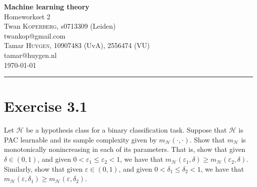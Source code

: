 \documentclass[10pt, a4paper, twoside]{amsart}
\makeatletter
\newcommand{\firstName}  {Twan}
\newcommand{\lastName}   {Koperberg}
\newcommand{\studId}     {0713309 (Leiden)}
\renewcommand{\email}    {twankop@gmail.com}
\newcommand{\firstNameII}  {Tamar}
\newcommand{\lastNameII}   {Huygen}
\newcommand{\studIdII}     {10907483 (UvA)}
\newcommand{\studIdIII}    {2556474 (VU)}
\newcommand{\emailII}     {tamar@huygen.nl}
\makeatother
\begin{document}
\begin{center}

  {\huge\bf Machine learning theory}\\
  {\large\sc Homeworkset 2 }\\ \vspace{1em}
  \firstName \textsc{ \lastName}, {\sc s}\studId \\
  \email\text{}\\ \smallskip
  \firstNameII \textsc{ \lastNameII}, \studIdII, \studIdIII\\
  \emailII \\ \bigskip
  \today \\\bigskip
  \hrule
  \bigskip
\end{center}


\section*{Exercise 3.1} 
Let $\mathcal{H}$ be a hypothesis class for a binary classification task. Suppose that $\mathcal{H}$ is PAC learnable and its sample complexity given by $m_{\mathcal{H}}(\cdot,\cdot)$.
Show that $m_{\mathcal{H}}$ is monotonically nonincreasing in each of its parameters. That is, show that given $\delta \in (0,1)$, and given $0<\varepsilon_1 \leq \varepsilon_2<1$, we have that $m_{\mathcal{H}}(\varepsilon_1, \delta) \geq m_{\mathcal{H}}(\varepsilon_2, \delta)$. Similarly, show that given $\varepsilon \in (0,1)$, and given $0<\delta_1 \leq \delta_2 <1$, we have that $m_{\mathcal{H}}(\varepsilon, \delta_1) \geq m_{\mathcal{H}}(\varepsilon, \delta_2)$.
\end{document}
